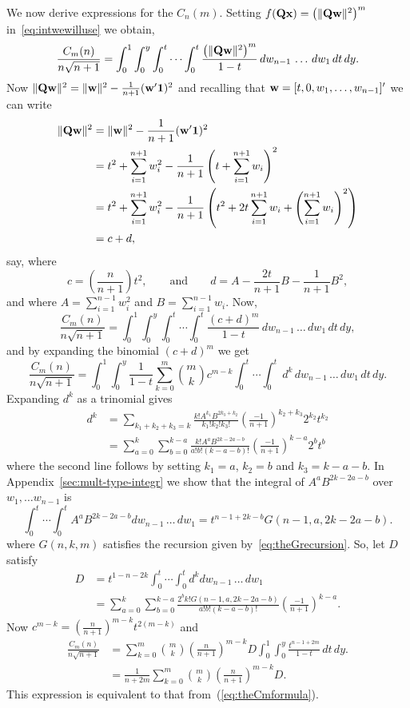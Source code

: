 \documentclass[draftcls, onecolumn, 11pt]{IEEEtran}
\begin{document}
We now derive expressions for the $C_n(m)$.  Setting $f(\mathbf{Q}\mathbf{x}) = \left(\|\mathbf{Q}\mathbf{w}\|^{2}\right)^m$ in~\eqref{eq:intwewilluse} we obtain, 
\[
\frac{C_m(n)}{n\sqrt{n+1}} = \int_0^1 \int_0^y \int_0^t \cdots \int_0^t \frac{\left(\|\mathbf{Q}\mathbf{w}\|^2\right)^m}{1 - t} \,dw_{n-1} \, \dots \, dw_1 \, dt \, dy.
\]
Now $\|\mathbf{Q}\mathbf{w}\|^2 = \|\mathbf{w}\|^2 - \frac{1}{n+1}(\mathbf{w}^\prime \boldsymbol{1})^2$ and recalling that $\mathbf{w} = [t,0,w_1,\dots,w_{n-1}]'$ we can write
\begin{align*}
\|\mathbf{Q}\mathbf{w}\|^2 &= \|\mathbf{w}\|^2 - \frac{1}{n+1}(\mathbf{w}^\prime \boldsymbol{1})^2 \\
&= t^2 + \sum_{i=1}^{n+1}w_i^2 - \frac{1}{n+1}\left( t + \sum_{i=1}^{n+1}w_i \right)^2 \\
&= t^2 + \sum_{i=1}^{n+1}w_i^2 - \frac{1}{n+1}\left( t^2 + 2 t \sum_{i=1}^{n+1}w_i + \left(\sum_{i=1}^{n+1}w_i \right)^2 \right)\\
&= c + d, 
\end{align*}
say, where
\[
c = \left(\frac{n}{n+1} \right) t^2,\qquad \text{and} \qquad d = A - \frac{2t}{n+1}B - \frac{1}{n+1}B^2,
\]
and where $A = \sum_{i=1}^{n-1}w_i^2$ and $B = \sum_{i=1}^{n-1}w_i$.  Now,
\[
 \frac{C_m(n)}{n\sqrt{n+1}} =  \int_0^1 \int_0^y \int_0^t \cdots \int_0^t \frac{(c+d)^m}{1 - t} \,dw_{n-1} \, \dots \, dw_1 \, dt \, dy,
\]
and by expanding the binomial $(c+d)^m$ we get
\[
\frac{C_m(n)}{n\sqrt{n+1}} =  \int_0^1 \int_0^y \frac{1}{1 - t}\sum_{k=0}^{m}\binom{m}{k} c^{m-k} \int_0^t \cdots \int_0^t \, d^{k} \,dw_{n-1} \, \dots \, dw_1 \, dt \, dy.
\]
Expanding $d^k$ as a trinomial gives
\begin{align*}
d^k &= \sum_{k_1+k_2+k_3=k} \frac{k! A^{k_1} B^{2k_3 + k_2}}{k_1! k_2! k_3!} \left(\frac{-1}{n+1}\right)^{k_2+k_3}2^{k_2}t^{k_2}  \\
&=  \sum_{a=0}^k\sum_{b=0}^{k-a} \frac{k!  A^{a} B^{2k - 2a - b}}{a! b! (k-a-b)!} \left(\frac{-1}{n+1}\right)^{k - a}2^{b}t^{b}
\end{align*}
where the second line follows by setting $k_1 = a$, $k_2 = b$ and $k_3 = k - a - b$.  In Appendix~\ref{sec:mult-type-integr} we show that the integral of $A^{a} B^{2k - 2a - b}$ over $w_1,\dots w_{n-1}$ is
\[
\int_0^t \cdots \int_0^t A^{a} B^{2k-2a-b} dw_{n-1} \, \dots \, dw_1 = t^{n-1+2k - b} G(n-1,a,2k - 2a - b).
\]
where $G(n,k,m)$ satisfies the recursion given by~\eqref{eq:theGrecursion}.  So, let $D$ satisfy
\begin{align*}
D &= t^{1 - n - 2k}\int_0^t \cdots \int_0^t d^k dw_{n-1} \, \dots \, dw_1 \\
&= \sum_{a=0}^k\sum_{b=0}^{k-a} \frac{2^{b} k!G(n-1,a,2k - 2a - b)}{a! b! (k-a-b)!} \left(\frac{-1}{n+1}\right)^{k - a}.
\end{align*}
Now $c^{m-k} = \left(\frac{n}{n+1} \right)^{m-k} t^{2(m-k)}$ and
\begin{align*}
\frac{C_m(n)}{n\sqrt{n+1}} &= \sum_{k=0}^{m} \binom{m}{k} \left(\frac{n}{n+1} \right)^{m-k} D \int_0^1 \int_0^y \frac{t^{n - 1 + 2m}}{1 - t} \, dt \, dy. \\
&= \frac{1}{n+2m} \sum_{k=0}^{m} \binom{m}{k} \left(\frac{n}{n+1} \right)^{m-k} D.
\end{align*}
This expression is equivalent to that from~(\ref{eq:theCmformula}).
\end{document}
